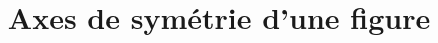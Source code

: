 \documentclass{beamer}
\title{Axes de symétrie d'une figure}
\author{}\institute{}
\begin{document}
\begin{frame}
  \titlepage
\end{frame}
\end{document}
